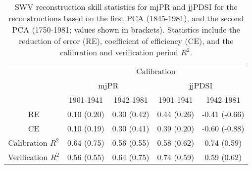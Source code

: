 
\begin{table}
\begin{center}
\begin{tabular}{ccccc}
\toprule
 & \multicolumn{4}{c}{Calibration} \\ \cmidrule(lr){2-5}
 & \multicolumn{2}{c}{mjPR} & \multicolumn{2}{c}{jjPDSI} \\ \cmidrule(lr){2-3} \cmidrule(lr){4-5} 
 & 1901-1941 & 1942-1981 & 1901-1941 & 1942-1981\\ \midrule
RE                 & 0.10 (0.20) & 0.30 (0.42) & 0.44 (0.26) & -0.41 (-0.66) \\
CE                 & 0.10 (0.19) & 0.30 (0.41) & 0.39 (0.20) & -0.60 (-0.88) \\
Calibration $R^2$  & 0.64 (0.75) & 0.56 (0.55) & 0.58 (0.62) & 0.74 (0.59)\\
Verification $R^2$ & 0.56 (0.55) & 0.64 (0.75) & 0.74 (0.59) & 0.59 (0.62)\\
\bottomrule
\end{tabular}
\caption{SWV reconstruction skill statistics for mjPR and jjPDSI for the reconstructions based on the first PCA (1845-1981), and the second PCA (1750-1981; values shown in brackets). Statistics include the reduction of error (RE), coefficient of efficiency (CE), and the calibration and verification period $R^2$.}%
\end{center}
\vspace{2cm}
\label{table:reconStats}
\end{table}

